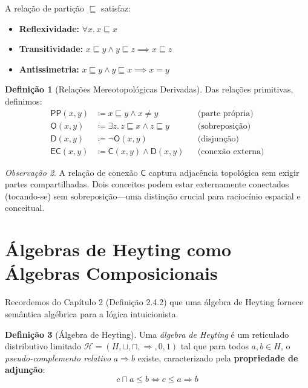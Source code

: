 \documentclass[12pt,a4paper]{article}
\theoremstyle{definition}
\newtheorem{definicao}{Definição}[section]
\theoremstyle{plain}
\theoremstyle{remark}
\newtheorem{observacao}[definicao]{Observação}
\newcommand{\defeq}{\coloneqq}
\begin{document}
A relação de partição $\sqsubseteq$ satisfaz:
\begin{itemize}
  \item \textbf{Reflexividade:} $\forall x.\, x \sqsubseteq x$
  \item \textbf{Transitividade:} $x \sqsubseteq y \land y \sqsubseteq z \implies x \sqsubseteq z$
  \item \textbf{Antissimetria:} $x \sqsubseteq y \land y \sqsubseteq x \implies x = y$
\end{itemize}

\begin{definicao}[Relações Mereotopológicas Derivadas]
Das relações primitivas, definimos:
\begin{align*}
  \mathsf{PP}(x, y) &\defeq x \sqsubseteq y \land x \neq y && \text{(parte própria)} \\
  \mathsf{O}(x, y) &\defeq \exists z.\, z \sqsubseteq x \land z \sqsubseteq y && \text{(sobreposição)} \\
  \mathsf{D}(x, y) &\defeq \neg \mathsf{O}(x, y) && \text{(disjunção)} \\
  \mathsf{EC}(x, y) &\defeq \mathsf{C}(x, y) \land \mathsf{D}(x, y) && \text{(conexão externa)}
\end{align*}
\end{definicao}

\begin{observacao}
A relação de conexão $\mathsf{C}$ captura adjacência topológica sem exigir partes compartilhadas. Dois conceitos podem estar externamente conectados (tocando-se) sem sobreposição---uma distinção crucial para raciocínio espacial e conceitual.
\end{observacao}

\section{Álgebras de Heyting como Álgebras Composicionais}

Recordemos do Capítulo 2 (Definição 2.4.2) que uma álgebra de Heyting fornece semântica algébrica para a lógica intuicionista.

\begin{definicao}[Álgebra de Heyting]
Uma \emph{álgebra de Heyting} é um reticulado distributivo limitado $\mathcal{H} = (H, \sqcup, \sqcap, \Rightarrow, 0, 1)$ tal que para todos $a, b \in H$, o \emph{pseudo-complemento relativo} $a \Rightarrow b$ existe, caracterizado pela \textbf{propriedade de adjunção}:
$$
c \sqcap a \leq b \iff c \leq a \Rightarrow b
$$
\end{definicao}
\end{document}
